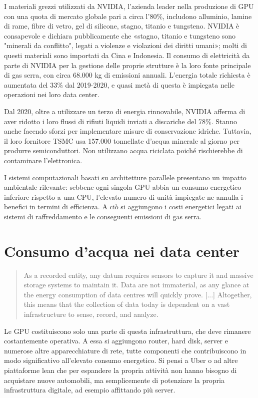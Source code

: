 \documentclass[12pt,a4paper,oneside]{book}
\begin{document}
I materiali grezzi utilizzati da NVIDIA, l'azienda leader nella produzione di GPU con una quota di mercato globale pari a circa l'80\%, includono alluminio, lamine di rame, fibre di vetro, gel di silicone, stagno, titanio e tungsteno. NVIDIA è consapevole e dichiara pubblicamente che «stagno, titanio e tungsteno sono "minerali da conflitto"\citep[p.36]{nvidia2021report}, legati a violenze e violazioni dei diritti umani»; molti di questi materiali sono importati da Cina e Indonesia.
Il consumo di elettricità da parte di NVIDIA per la gestione delle proprie strutture è la loro fonte principale di gas serra, con circa 68.000 kg di emissioni annuali. L'energia totale richiesta è aumentata del 33\% dal 2019-2020, e quasi metà di questa è impiegata nelle operazioni nei loro data center.

Dal 2020, oltre a utilizzare un terzo di energia rinnovabile, NVIDIA afferma di aver ridotto i loro flussi di rifiuti liquidi inviati a discariche del 78\%. Stanno anche facendo sforzi per implementare misure di conservazione idriche. Tuttavia, il loro fornitore TSMC usa 157.000 tonnellate d'acqua minerale al giorno per produrre semiconduttori. Non utilizzano acqua riciclata poiché rischierebbe di contaminare l'elettronica.

I sistemi computazionali basati su architetture parallele presentano un impatto ambientale rilevante: sebbene ogni singola GPU abbia un consumo energetico inferiore rispetto a una CPU, l'elevato numero di unità impiegate ne annulla i benefici in termini di efficienza. A ciò si aggiungono i costi energetici legati ai sistemi di raffreddamento e le conseguenti emissioni di gas serra.

\chapter{Consumo d'acqua nei data center}

\begin{quote}
\small
As a recorded entity, any datum requires sensors to capture it and massive storage systems to maintain it. Data are not immaterial, as any glance at the energy consumption of data centres will quickly prove. [...] Altogether, this means that the collection of data today is dependent on a vast infrastructure to sense, record, and analyze.\citep[p.28]{srnicek2017platform}
\end{quote}

Le GPU costituiscono solo una parte di questa infrastruttura, che deve rimanere costantemente operativa. A essa si aggiungono router, hard disk, server e numerose altre apparecchiature di rete, tutte componenti che contribuiscono in modo significativo all'elevato consumo energetico. Si pensi a Uber o ad altre piattaforme lean che per espandere la propria attività non hanno bisogno di acquistare nuove automobili, ma semplicemente di potenziare la propria infrastruttura digitale, ad esempio affittando più server. \citep[p.31]{srnicek2017platform}
\end{document}

